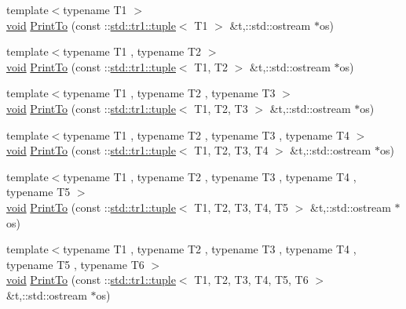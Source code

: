 \begin{DoxyCompactItemize}
\item 
{\footnotesize template$<$typename T1 $>$ }\\\hyperlink{legacy_8hpp_a8bb47f092d473522721002c86c13b94e}{void} \hyperlink{namespacetesting_1_1internal_ab084eab9c8c2fb4fd55cfe579fa72da2}{Print\-To} (const \-::\hyperlink{classstd_1_1tr1_1_1tuple}{std\-::tr1\-::tuple}$<$ T1 $>$ \&t,\-::std\-::ostream $\ast$os)
\item 
{\footnotesize template$<$typename T1 , typename T2 $>$ }\\\hyperlink{legacy_8hpp_a8bb47f092d473522721002c86c13b94e}{void} \hyperlink{namespacetesting_1_1internal_afd9f9d3d4fcf0552e0959d9d67277534}{Print\-To} (const \-::\hyperlink{classstd_1_1tr1_1_1tuple}{std\-::tr1\-::tuple}$<$ T1, T2 $>$ \&t,\-::std\-::ostream $\ast$os)
\item 
{\footnotesize template$<$typename T1 , typename T2 , typename T3 $>$ }\\\hyperlink{legacy_8hpp_a8bb47f092d473522721002c86c13b94e}{void} \hyperlink{namespacetesting_1_1internal_a7bfff6af85d2ba6b042cbd8297bee03e}{Print\-To} (const \-::\hyperlink{classstd_1_1tr1_1_1tuple}{std\-::tr1\-::tuple}$<$ T1, T2, T3 $>$ \&t,\-::std\-::ostream $\ast$os)
\item 
{\footnotesize template$<$typename T1 , typename T2 , typename T3 , typename T4 $>$ }\\\hyperlink{legacy_8hpp_a8bb47f092d473522721002c86c13b94e}{void} \hyperlink{namespacetesting_1_1internal_a2b8b95c16dddc5d4de96f9ef10fb4dae}{Print\-To} (const \-::\hyperlink{classstd_1_1tr1_1_1tuple}{std\-::tr1\-::tuple}$<$ T1, T2, T3, T4 $>$ \&t,\-::std\-::ostream $\ast$os)
\item 
{\footnotesize template$<$typename T1 , typename T2 , typename T3 , typename T4 , typename T5 $>$ }\\\hyperlink{legacy_8hpp_a8bb47f092d473522721002c86c13b94e}{void} \hyperlink{namespacetesting_1_1internal_adc2a693cdb33cd4d3881e4c8b16d9865}{Print\-To} (const \-::\hyperlink{classstd_1_1tr1_1_1tuple}{std\-::tr1\-::tuple}$<$ T1, T2, T3, T4, T5 $>$ \&t,\-::std\-::ostream $\ast$os)
\item 
{\footnotesize template$<$typename T1 , typename T2 , typename T3 , typename T4 , typename T5 , typename T6 $>$ }\\\hyperlink{legacy_8hpp_a8bb47f092d473522721002c86c13b94e}{void} \hyperlink{namespacetesting_1_1internal_a205f62732d75b884f0668eb4483b2a58}{Print\-To} (const \-::\hyperlink{classstd_1_1tr1_1_1tuple}{std\-::tr1\-::tuple}$<$ T1, T2, T3, T4, T5, T6 $>$ \&t,\-::std\-::ostream $\ast$os)

\end{DoxyCompactItemize}
